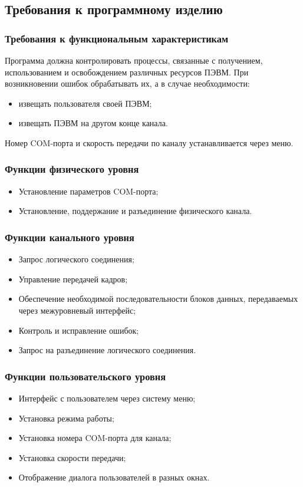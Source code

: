 \documentclass[14pt]{extarticle}
\begin{document}
\subsection{Требования к программному изделию}
\subsubsection{Требования к функциональным характеристикам}
Программа должна контролировать процессы, связанные с получением, использованием и освобождением различных ресурсов ПЭВМ. При возникновении ошибок обрабатывать их, а в случае необходимости:
\begin{itemize}
\item извещать пользователя своей ПЭВМ;
\item извещать ПЭВМ на другом конце канала.
\end{itemize}

Номер COM-порта и скорость передачи по каналу устанавливается через меню.

\subsubsection{Функции физического уровня}
\begin{itemize}
\item Установление параметров COM-порта;
\item Установление, поддержание и разъединение физического канала.
\end{itemize}

\subsubsection{Функции канального уровня}
\begin{itemize}
\item Запрос логического соединения;
\item Управление передачей кадров;
\item Обеспечение необходимой последовательности блоков данных, передаваемых через межуровневый интерфейс;
\item Контроль и исправление ошибок;
\item Запрос на разъединение логического соединения.
\end{itemize}

\subsubsection{Функции пользовательского уровня}
\begin{itemize}
\item Интерфейс с пользователем через систему меню;
\item Установка режима работы;
\item Установка номера COM-порта для канала;
\item Установка скорости передачи;
\item Отображение диалога пользователей в разных окнах.
\end{itemize}
\end{document}
